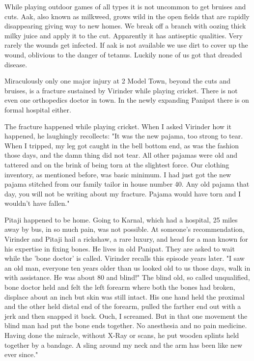 While playing outdoor games of all types it is not uncommon to get bruises
and cuts. Aak, also known as milkweed, grows wild in the open fields that
are rapidly disappearing giving way to new homes. We break off a branch
with oozing thick milky juice and apply it to the cut. Apparently it has
antiseptic qualities. Very rarely the wounds get infected. If aak is not
available we use dirt to cover up the wound, oblivious to the danger of
tetanus. Luckily none of us got that dreaded disease. 

Miraculously only one major injury at 2 Model Town, beyond the cuts and
bruises, is a fracture sustained by Virinder while playing cricket. There
is not even one orthopedics doctor in town.  In the newly expanding
Panipat there is on formal hospital either. 

The fracture happened while playing cricket. When I asked Virinder how it
happened, he laughingly recollects: "It was the new pajama, too strong to
tear. When I tripped, my leg got caught in the bell bottom end, as was the
fashion those days, and the damn thing did not tear. All other pajamas
were old and tattered and on the brink of being torn at the slightest
force.  Our clothing inventory, as mentioned before, was basic minimum.
I had just got the new pajama stitched from our family tailor in house
number 40.  Any old pajama that day, you will not be writing about my
fracture.  Pajama would have torn and I wouldn't have fallen."

Pitaji happened to be home. Going to Karnal, which had a hospital, 25
miles away by bus, in so much pain, was not possible. At someone's
recommendation, Virinder and Pitaji hail a rickshaw, a rare luxury, and
head for a man known for his expertise in fixing bones. He lives in old
Panipat. They are asked to wait while the 'bone doctor' is called.
Virinder recalls this episode years later. "I saw an old man, everyone ten
years older than us looked old to us those days, walk in with assistance.
He was about 80 and blind!" The blind old, so called unqualified, bone
doctor held and felt the left forearm where both the bones had broken,
displace about an inch but skin was still intact. His one hand held the
proximal and the other held distal end of the forearm, pulled the farther
end out with a jerk and then snapped it back. Ouch, I screamed. But in
that one movement the blind man had put the bone ends together. No
anesthesia and no pain medicine. Having done the miracle, without X-Ray or
scans, he put wooden splints held together by a bandage. A sling around my
neck and the arm has been like new ever since."


